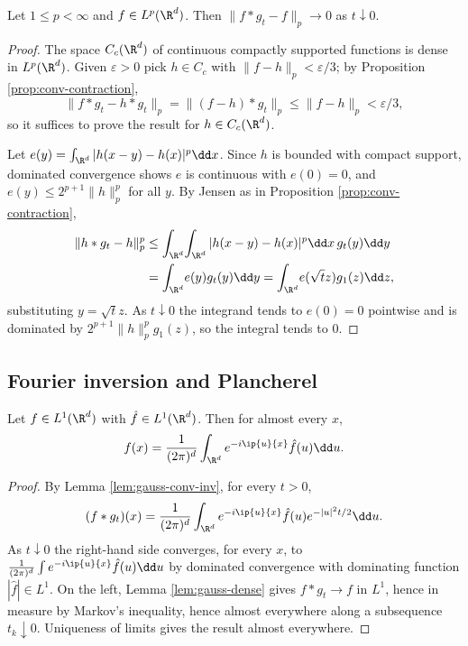 \begin{lemma}\label{lem:gauss-dense}
	Let $1\leq p<\infty$ and $f \in L^p(\R^d)$. Then $\|f*g_t - f\|_p \to 0$ as $t \downarrow 0$.
\end{lemma}
\begin{proof}
	The space $C_c(\R^d)$ of continuous compactly supported functions is dense in $L^p(\R^d)$. Given $\varepsilon>0$ pick $h \in C_c$ with $\|f-h\|_p<\varepsilon/3$; by Proposition \ref{prop:conv-contraction},
	$$
	\|f*g_t - h*g_t\|_p = \|(f-h)*g_t\|_p \leq \|f-h\|_p<\varepsilon/3,
	$$
	so it suffices to prove the result for $h \in C_c(\R^d)$.

	Let $e(y)=\int_{\R^d}|h(x-y)-h(x)|^p\dd x$. Since $h$ is bounded with compact support, dominated convergence shows $e$ is continuous with $e(0)=0$, and $e(y) \leq 2^{p+1}\|h\|_p^p$ for all $y$. By Jensen as in Proposition \ref{prop:conv-contraction},
	\begin{align*}
		\|h*g_t - h\|_p^p &\leq \int_{\R^d}\!\int_{\R^d}|h(x-y)-h(x)|^p\dd x\,g_t(y)\dd y\\
		&=\int_{\R^d}\!e(y)g_t(y)\dd y = \int_{\R^d}\!e(\sqrt t z)g_1(z)\dd z,
	\end{align*}
	substituting $y = \sqrt t z$. As $t\downarrow0$ the integrand tends to $e(0)=0$ pointwise and is dominated by $2^{p+1}\|h\|_p^p g_1(z)$, so the integral tends to $0$.
\end{proof}

\subsection{Fourier inversion and Plancherel}

\begin{theorem}\label{thm:fourier-inv}
	Let $f \in L^1(\R^d)$ with $\hat f \in L^1(\R^d)$. Then for almost every $x$,
	$$
	f(x) = \frac{1}{(2\pi)^d}\int_{\R^d}e^{-i\ip{u}{x}}\hat f(u)\dd u.
	$$
\end{theorem}
\begin{proof}
	By Lemma \ref{lem:gauss-conv-inv}, for every $t>0$,
	$$
	(f*g_t)(x)=\frac{1}{(2\pi)^d}\int_{\R^d}e^{-i\ip{u}{x}}\hat f(u)e^{-|u|^2t/2}\dd u.
	$$
	As $t \downarrow 0$ the right-hand side converges, for every $x$, to $\frac{1}{(2\pi)^d}\int e^{-i\ip{u}{x}}\hat f(u)\dd u$ by dominated convergence with dominating function $|\hat f| \in L^1$. On the left, Lemma \ref{lem:gauss-dense} gives $f*g_t \to f$ in $L^1$, hence in measure by Markov's inequality, hence almost everywhere along a subsequence $t_k \downarrow 0$. Uniqueness of limits gives the result almost everywhere.
\end{proof}

